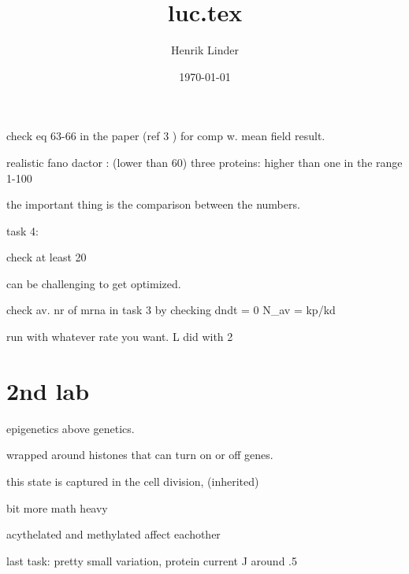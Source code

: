 \documentclass{article}
\title{luc.tex }
\author{Henrik Linder}
\date{\today}
\begin{document}
\maketitle

check eq 63-66 in the paper (ref 3 ) for comp w. mean field result. 

realistic fano dactor : (lower than 60)
 three proteins: higher than one
 in the range 1-100

 the important thing is the comparison between the numbers. 

 task 4: 

 check at least 20

 can be challenging to get optimized. 

 

 check av. nr of mrna in task 3 by  checking dndt = 0
 N\_av = kp/kd

 run with whatever rate you want. L did with 2 




\section{2nd lab}
epigenetics
above genetics. 

wrapped around histones that can turn on or off genes. 

this state is captured in the cell division, (inherited)

bit more math heavy

acythelated and methylated affect eachother 



last task: pretty small variation, protein current J around .5
\end{document}
